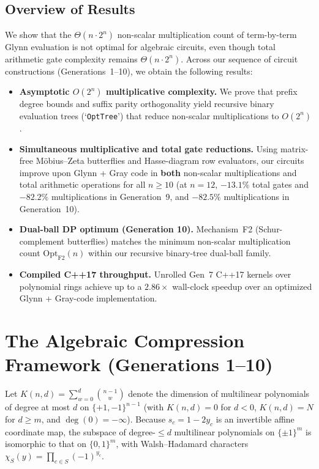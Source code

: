 \documentclass[11pt,a4paper]{article}
\begin{document}
\subsection{Overview of Results}
We show that the $\Theta(n \cdot 2^n)$ non-scalar multiplication count of term-by-term Glynn evaluation is not optimal for algebraic circuits, even though total arithmetic gate complexity remains $\Theta(n \cdot 2^n)$. Across our sequence of circuit constructions (Generations~1--10), we obtain the following results:
\begin{itemize}[leftmargin=*]
    \item \textbf{Asymptotic $O(2^n)$ multiplicative complexity.} We prove that prefix degree bounds and suffix parity orthogonality yield recursive binary evaluation trees (`\texttt{OptTree}') that reduce non-scalar multiplications to $O(2^n)$.
    \item \textbf{Simultaneous multiplicative and total gate reductions.} Using matrix-free M\"obius--Zeta butterflies and Hasse-diagram row evaluators, our circuits improve upon Glynn + Gray code in \textbf{both} non-scalar multiplications and total arithmetic operations for all $n \ge 10$ (at $n = 12$, $-13.1\%$ total gates and $-82.2\%$ multiplications in Generation~9, and $-82.5\%$ multiplications in Generation~10).
    \item \textbf{Dual-ball DP optimum (Generation 10).} Mechanism~F2 (Schur-complement butterflies) matches the minimum non-scalar multiplication count $\mathrm{Opt}_{\mathrm{F2}}(n)$ within our recursive binary-tree dual-ball family.
    \item \textbf{Compiled C++17 throughput.} Unrolled Gen~7 C++17 kernels over polynomial rings achieve up to a $2.86\times$ wall-clock speedup over an optimized Glynn + Gray-code implementation.
\end{itemize}

\section{The Algebraic Compression Framework (Generations 1--10)}

Let $K(n, d) = \sum_{w=0}^{d} \binom{n-1}{w}$ denote the dimension of multilinear polynomials of degree at most $d$ on $\{+1,-1\}^{n-1}$ (with $K(n,d) = 0$ for $d < 0$, $K(n,d) = N$ for $d \ge m$, and $\deg(0) = -\infty$). Because $s_c = 1 - 2 y_c$ is an invertible affine coordinate map, the subspace of degree-$\le d$ multilinear polynomials on $\{\pm 1\}^m$ is isomorphic to that on $\{0,1\}^m$, with Walsh--Hadamard characters $\chi_S(y) = \prod_{c \in S} (-1)^{y_c}$.
\end{document}
